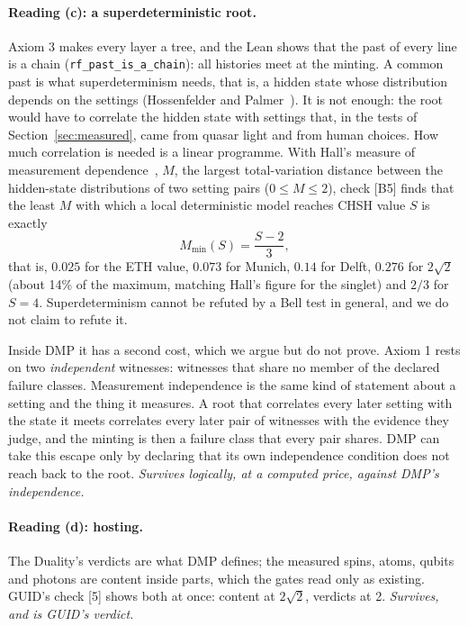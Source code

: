 \documentclass[11pt,a4paper]{article}
\theoremstyle{definition}
\theoremstyle{remark}
\newcommand{\lean}[1]{\texttt{#1}}
\newcommand{\chk}[1]{\textsf{[#1]}}
\begin{document}
\paragraph{Reading (c): a superdeterministic root.} Axiom 3 makes every layer a tree, and the Lean shows that the past of every line is a
chain (\lean{rf\_past\_is\_a\_chain}): all histories meet at the minting. A common past is what superdeterminism needs, that is, a hidden
state whose distribution depends on the settings (Hossenfelder and Palmer~\cite{hp}). It is not enough: the root would have to correlate
the hidden state with settings that, in the tests of Section~\ref{sec:measured}, came from quasar light and from human choices. How much
correlation is needed is a linear programme. With Hall's measure of measurement dependence~\cite{hall}, $M$, the largest total-variation
distance between the hidden-state distributions of two setting pairs ($0\le M\le2$), check \chk{B5} finds that the least $M$ with which a
local deterministic model reaches CHSH value $S$ is exactly
\[
M_{\min}(S)=\frac{S-2}{3},
\]
that is, $0.025$ for the ETH value, $0.073$ for Munich, $0.14$ for Delft, $0.276$ for $2\sqrt2$ (about 14\% of the maximum, matching
Hall's figure for the singlet) and $2/3$ for $S=4$. Superdeterminism cannot be refuted by a Bell test in general, and we do not claim to
refute it.

Inside DMP it has a second cost, which we argue but do not prove. Axiom 1 rests on two \emph{independent} witnesses: witnesses that share no
member of the declared failure classes. Measurement independence is the same kind of statement about a setting and the thing it measures.
A root that correlates every later setting with the state it meets correlates every later pair of witnesses with the evidence they judge,
and the minting is then a failure class that every pair shares. DMP can take this escape only by declaring that its own independence
condition does not reach back to the root. \emph{Survives logically, at a computed price, against DMP's independence.}

\paragraph{Reading (d): hosting.} The Duality's verdicts are what DMP defines; the measured spins, atoms, qubits and photons are content
inside parts, which the gates read only as existing. GUID's check [5] shows both at once: content at $2\sqrt2$, verdicts at 2.
\emph{Survives, and is GUID's verdict.}
\end{document}
